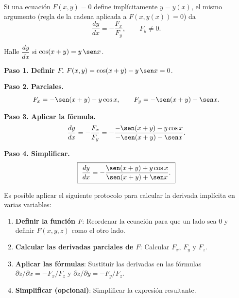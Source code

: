 \begin{rem}[Caso de una ecuación $F(x,y)=0$]
Si una ecuación $F(x,y)=0$ define implícitamente $y=y(x)$, el mismo argumento
(regla de la cadena aplicada a $F(x,y(x))=0$) da
\[
  \frac{dy}{dx}=-\frac{F_x}{F_y},\qquad F_y\neq 0.
\]
\end{rem}

\begin{prob}
Halle $\dfrac{dy}{dx}$ si $\cos(x+y)=y\,\sen x$.
\begin{myproof}
\textbf{Paso 1. Definir $F$.}
$F(x,y)=\cos(x+y)-y\,\sen x=0$.

\textbf{Paso 2. Parciales.}
\[
  F_x=-\sen(x+y)-y\cos x,\qquad
  F_y=-\sen(x+y)-\sen x.
\]

\textbf{Paso 3. Aplicar la fórmula.}
\[
  \frac{dy}{dx}=-\frac{F_x}{F_y}
  =-\frac{-\sen(x+y)-y\cos x}{-\sen(x+y)-\sen x}.
\]

\textbf{Paso 4. Simplificar.}
\[
  \boxed{\ \frac{dy}{dx}=-\frac{\sen(x+y)+y\cos x}{\sen(x+y)+\sen x}.\ }
\]
\end{myproof}
\end{prob}

\begin{pasos}[Protocolo para derivación implícita de $z$ definida por $F(x, y, z) = 0$] Es posible aplicar el siguiente protocolo para calcular la derivada implícita en varias variables:
\begin{enumerate}
    \item \textbf{Definir la función $F$}: Reordenar la ecuación para que un lado sea $0$ y definir $F(x, y, z)$ como el otro lado.
    \item \textbf{Calcular las derivadas parciales de $F$}: Calcular $F_x$, $F_y$ y $F_z$.
    \item \textbf{Aplicar las fórmulas}: Sustituir las derivadas en las fórmulas $\partial z/\partial x = -F_x/F_z$ y $\partial z/\partial y = -F_y/F_z$.
    \item \textbf{Simplificar (opcional)}: Simplificar la expresión resultante.
\end{enumerate}
\end{pasos}

